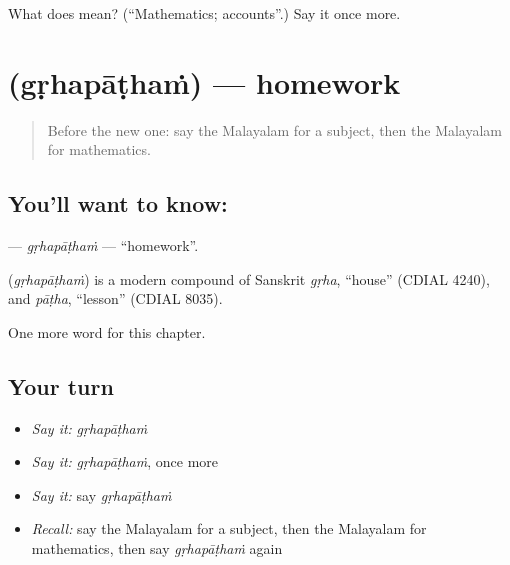 \begin{tcolorbox}[breakable,colback=teal!4,colframe=teal!35!black,title={Before you move on}]
What does  mean? (\textquotedblleft{}Mathematics; accounts\textquotedblright{}.) Say it once more.
\end{tcolorbox}
\section[\texorpdfstring{\ml{ഗൃഹപാഠം} (gṛhapāṭhaṁ)}{ഗൃഹപാഠം (gṛhapāṭhaṁ)}]{ (gṛhapāṭhaṁ) — homework}

\label{lesson:ML-C335-grhapatham}



\begin{quote}
Before the new one: say the Malayalam for a subject, then the Malayalam for mathematics.
\end{quote}

\subsection*{You'll want to know: }
\textbf{} — \emph{gṛhapāṭhaṁ} — \textquotedblleft{}homework\textquotedblright{}.

\begin{cousinweb}
\textbf{} (\emph{gṛhapāṭhaṁ}) is a modern compound of Sanskrit \emph{gṛha}, \textquotedblleft{}house\textquotedblright{} (CDIAL 4240), and \emph{pāṭha}, \textquotedblleft{}lesson\textquotedblright{} (CDIAL 8035).
\end{cousinweb}

\begin{grammarlens}[title={What you've built}]
One more word for this chapter.
\end{grammarlens}

\subsection*{Your turn}
\begin{itemize}
\raggedright
  \item \emph{Say it:} \emph{gṛhapāṭhaṁ}
  \item \emph{Say it:} \emph{gṛhapāṭhaṁ}, once more
  \item \emph{Say it:} say \emph{gṛhapāṭhaṁ}
  \item \emph{Recall:} say the Malayalam for a subject, then the Malayalam for mathematics, then say \emph{gṛhapāṭhaṁ} again
\end{itemize}

